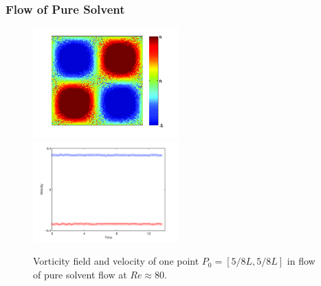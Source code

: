 \begin{frame}
  \frametitle{Flow of Pure Solvent}

\begin{figure}
    \centering
    \includegraphics[width=0.5\textwidth]{img/polymer_loc-15.png}
    \includegraphics[width=0.5\textwidth]{img/polymer_loc-9.png}
    \caption{Vorticity field and velocity of one point $P_0=[5/8L,5/8L]$ in flow of pure solvent flow at $Re\approx 80$.}
    \label{fig:vor_sol}
  \end{figure}
\end{frame}

